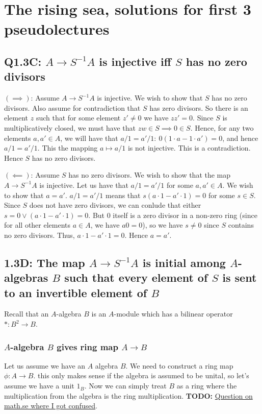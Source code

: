 \documentclass{book}
\theoremstyle{definition}
\begin{document}
\chapter{The rising sea, solutions for first 3 pseudolectures}
\section{Q1.3C: $A \rightarrow S^{-1}A$ is injective iff $S$ has no zero divisors}
$(\implies)$: 
Assume $A \rightarrow S^{-1}A$ is injective. We wish to show that $S$ has no 
zero divisors. Also assume for contradiction that
$S$ has zero divisors. So there is an element $z$ such that for some
element $z' \neq 0$ we have $zz' = 0$.
Since $S$ is multiplicatively closed, we must have that $zw \in S \implies 0 \in S$.
Hence, for any two elements $a, a' \in A$, we will have that $a/1 = a'/1: ~ 0(1\cdot a - 1\cdot a') = 0$,
and hence $a/1 = a'/1$. This the mapping  $a \mapsto a/1$ is not injective. This
is a contradiction. Hence $S$ has no zero divisors.

$(\impliedby)$:
Assume $S$ has no zero divisors. We wish to show that the map $A \rightarrow S^{-1}A$
is injective. Let us have that $a/1 = a'/1$ for some $a, a' \in A$. We wish to show
that $a = a'$. $a/1 = a'/1$ means that $s(a\cdot 1 - a' \cdot 1) = 0$  for some $s \in S$.
Since $S$ does not have zero divisors, we can conlude that either $s = 0 \lor (a\cdot 1 - a' \cdot 1) = 0$.
But $0$ itself is a zero divisor in a non-zero ring (since for all other elements $a \in A$, we have $a0 = 0$),
so we have $s \neq 0$ since $S$ contains no zero divisors. Thus, $a \cdot 1 - a' \cdot 1 = 0$.
Hence $a = a'$.

\section{1.3D: The map $A \rightarrow S^{-1}A$ is initial among $A$-algebras $B$ such that every element of $S$
         is sent to an invertible element of $B$}
Recall that an $A$-algebra $B$ is an $A$-module which has a bilinear operator $*: B^2 \rightarrow B$.

\subsection{$A$-algebra $B$ gives ring map $A \rightarrow B$}
Let us assume we have an $A$ algebra $B$. We need to construct a ring map $\phi: A \rightarrow B$.
this only makes sense if the algebra is assumed to be unital, so let's assume we have a unit $1_B$.
Now we can simply treat $B$ as a ring where the multiplication from the algebra is the ring multiplication.
\textbf{TODO:}
\href{https://math.stackexchange.com/questions/3756749/an-a-algebra-b-carries-the-same-data-as-a-ring-map-a-rightarrow-b}{Question on math.se where I got confused}.
\end{document}
